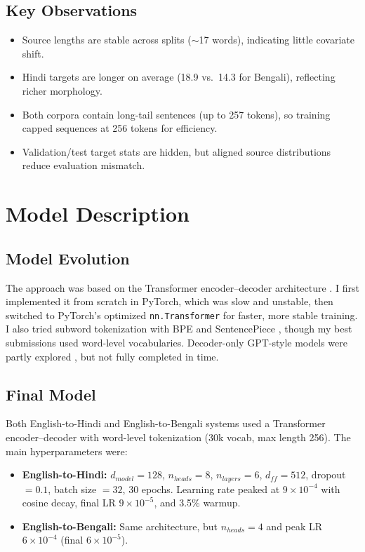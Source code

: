 \documentclass[11pt, oneside]{article}   	%
\begin{document}
\subsection{Key Observations}
\begin{itemize}
    \item Source lengths are stable across splits ($\sim$17 words), indicating little covariate shift.  
    \item Hindi targets are longer on average (18.9 vs.\ 14.3 for Bengali), reflecting richer morphology.  
    \item Both corpora contain long-tail sentences (up to 257 tokens), so training capped sequences at 256 tokens for efficiency.  
    \item Validation/test target stats are hidden, but aligned source distributions reduce evaluation mismatch.  
\end{itemize}

 \section{Model Description}
\subsection{Model Evolution}
The approach was based on the Transformer encoder–decoder architecture \cite{vaswani2017attention}. I first implemented it from scratch in PyTorch, which was slow and unstable, then switched to PyTorch’s optimized \texttt{nn.Transformer} \cite{paszke2019pytorch,pytorchdocs} for faster, more stable training.  
I also tried subword tokenization with BPE \cite{sennrich2016neural} and SentencePiece \cite{kudo2018sentencepiece}, though my best submissions used word-level vocabularies. Decoder-only GPT-style models were partly explored \cite{radford2019language,brown2020language}, but not fully completed in time.


\subsection{Final Model}
Both English-to-Hindi and English-to-Bengali systems used a Transformer encoder–decoder with word-level tokenization (30k vocab, max length 256). The main hyperparameters were:

\begin{itemize}
    \item \textbf{English-to-Hindi:} $d_{model}=128$, $n_{heads}=8$, $n_{layers}=6$, $d_{ff}=512$, dropout $=0.1$, batch size $=32$, 30 epochs. Learning rate peaked at $9\times10^{-4}$ with cosine decay, final LR $9\times10^{-5}$, and 3.5\% warmup.  
    \item \textbf{English-to-Bengali:} Same architecture, but $n_{heads}=4$ and peak LR $6\times10^{-4}$ (final $6\times10^{-5}$).  
\end{itemize}
\end{document}
